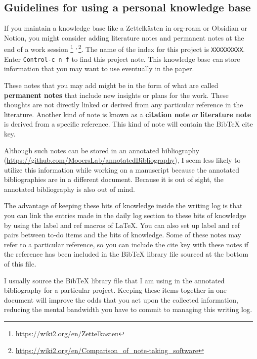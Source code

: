 \documentclass[11pt,letterpaper]{article}
\begin{document}
\subsection{Guidelines for using a personal knowledge base}
\label{sec:org8cfb260}

If you maintain a knowledge base like a Zettelkästen in org-roam or
Obsidian or Notion, you might consider adding literature notes and
permanent notes at the end of a work session \footnote{\url{https://wiki2.org/en/Zettelkasten}} \textsuperscript{,}\,\footnote{\url{https://wiki2.org/en/Comparison\_of\_note-taking\_software}}. The name of
the index for this project is \texttt{XXXXXXXXX}. Enter \texttt{Control-c n f} to find
this project note. This knowledge base can store information that you
may want to use eventually in the paper.

These notes that you may add might be in the form of what are called
\textbf{permanent notes} that include new insights or plans for the work. These
thoughts are not directly linked or derived from any particular
reference in the literature. Another kind of note is known as a
\textbf{citation note} or \textbf{literature note} is derived from a specific
reference. This kind of note will contain the BibTeX cite key.

Although such notes can be stored in an annotated bibliography
(\url{https://github.com/MooersLab/annotatedBibliography}), I seem less likely
to utilize this information while working on a manuscript because the
annotated bibliographies are in a different document. Because it is out
of sight, the annotated bibliography is also out of mind.

The advantage of keeping these bits of knowledge inside the writing log
is that you can link the entries made in the daily log section to these
bits of knowledge by using the label and ref macros of \LaTeX{}. You can
also set up label and ref pairs between to-do items and the bits of
knowledge. Some of these notes may refer to a particular reference, so
you can include the cite key with these notes if the reference has been
included in the BibTeX library file sourced at the bottom of this file.

I usually source the BibTeX library file that I am using in the
annotated bibliography for a particular project. Keeping these items
together in one document will improve the odds that you act upon the
collected information, reducing the mental bandwidth you have to commit
to managing this writing log.
\end{document}
